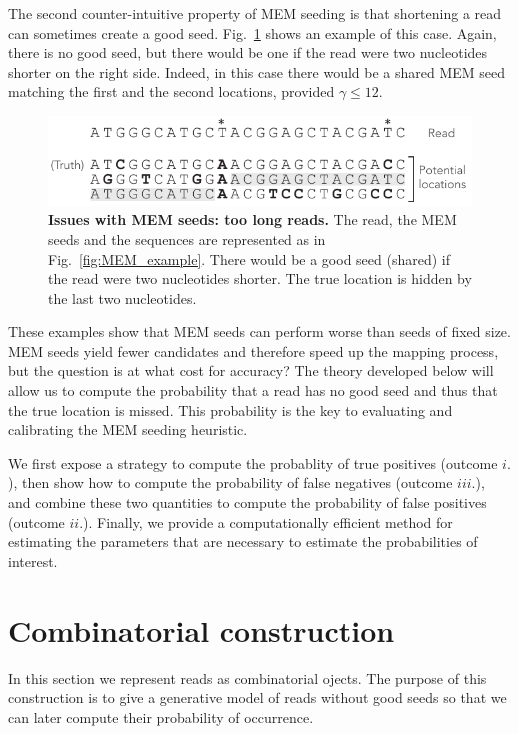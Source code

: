 \documentclass{article}
\begin{document}
The second counter-intuitive property of MEM seeding is that shortening
a read can sometimes create a good seed. Fig.~\ref{fig:short_vs_long}
shows an example of this case. Again, there is no good seed, but there
would be one if the read were two nucleotides shorter on the right side.
Indeed, in this case there would be a shared MEM seed matching the first
and the second locations, provided $\gamma \leq 12$.


\begin{figure}[h]
\centering
\includegraphics[scale=1]{short_vs_long_example.pdf}
\caption{\textbf{Issues with MEM seeds: too long reads.}
The read, the MEM seeds and the sequences are represented as in
Fig.~\ref{fig:MEM_example}. There would be a good seed (shared) if the
read were two nucleotides shorter. The true location is hidden by
the last two nucleotides.}
\label{fig:short_vs_long}
\end{figure}

These examples show that MEM seeds can perform worse than seeds of fixed
size. MEM seeds yield fewer candidates and therefore speed up the mapping
process, but the question is at what cost for accuracy? The theory
developed below will allow us to compute the probability that a read has
no good seed and thus that the true location is missed. This probability
is the key to evaluating and calibrating the MEM seeding heuristic.

We first expose a strategy to compute the probablity of true positives
(outcome $i.$), then show how to compute the probability of false
negatives (outcome $iii.$), and combine these two quantities to compute
the probability of false positives (outcome $ii.$). Finally, we provide a
computationally efficient method for estimating the parameters that are
necessary to estimate the probabilities of interest.


\section{Combinatorial construction}

In this section we represent reads as combinatorial ojects. The purpose of
this construction is to give a generative model of reads without good
seeds so that we can later compute their probability of occurrence.
\end{document}
